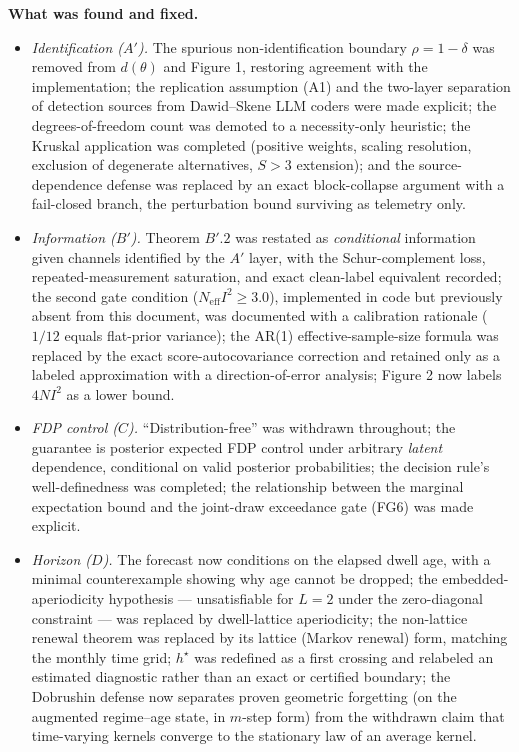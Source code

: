\documentclass[11pt,a4paper]{article}
\begin{document}
\textbf{What was found and fixed.}
\begin{itemize}
    \item \emph{Identification ($A'$).} The spurious non-identification boundary $\rho = 1 - \delta$ was removed from $d(\theta)$ and Figure 1, restoring agreement with the implementation; the replication assumption (A1) and the two-layer separation of detection sources from Dawid--Skene LLM coders were made explicit; the degrees-of-freedom count was demoted to a necessity-only heuristic; the Kruskal application was completed (positive weights, scaling resolution, exclusion of degenerate alternatives, $S > 3$ extension); and the source-dependence defense was replaced by an exact block-collapse argument with a fail-closed branch, the perturbation bound surviving as telemetry only.
    \item \emph{Information ($B'$).} Theorem $B'.2$ was restated as \emph{conditional} information given channels identified by the $A'$ layer, with the Schur-complement loss, repeated-measurement saturation, and exact clean-label equivalent recorded; the second gate condition ($N_{\mathrm{eff}} I^2 \ge 3.0$), implemented in code but previously absent from this document, was documented with a calibration rationale ($1/12$ equals flat-prior variance); the AR(1) effective-sample-size formula was replaced by the exact score-autocovariance correction and retained only as a labeled approximation with a direction-of-error analysis; Figure 2 now labels $4NI^2$ as a lower bound.
    \item \emph{FDP control ($C$).} ``Distribution-free'' was withdrawn throughout; the guarantee is posterior expected FDP control under arbitrary \emph{latent} dependence, conditional on valid posterior probabilities; the decision rule's well-definedness was completed; the relationship between the marginal expectation bound and the joint-draw exceedance gate (FG6) was made explicit.
    \item \emph{Horizon ($D$).} The forecast now conditions on the elapsed dwell age, with a minimal counterexample showing why age cannot be dropped; the embedded-aperiodicity hypothesis --- unsatisfiable for $L = 2$ under the zero-diagonal constraint --- was replaced by dwell-lattice aperiodicity; the non-lattice renewal theorem was replaced by its lattice (Markov renewal) form, matching the monthly time grid; $h^\star$ was redefined as a first crossing and relabeled an estimated diagnostic rather than an exact or certified boundary; the Dobrushin defense now separates proven geometric forgetting (on the augmented regime--age state, in $m$-step form) from the withdrawn claim that time-varying kernels converge to the stationary law of an average kernel.
\end{itemize}
\end{document}
